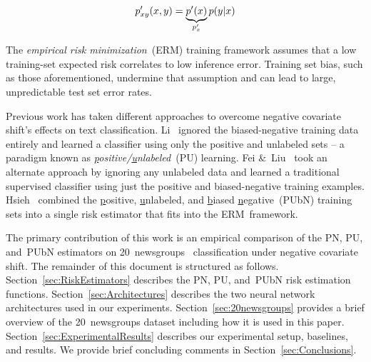 \documentclass[]{subfiles}
\begin{document}
\begin{equation}\label{eq:TestDist}
  p_{xy}'(x,y) = \underbrace{p'(x)}_{p_{x}'} p(y \vert x)
\end{equation}

The \textit{empirical risk minimization}~(ERM) training framework assumes that a low training-set expected risk correlates to low inference error. Training set bias, such as those aforementioned, undermine that assumption and can lead to large, unpredictable test set error rates.

Previous work has taken different approaches to overcome negative covariate shift's effects on text classification.  Li\etal~\cite{Li:2010} ignored the biased-negative training data entirely and learned a classifier using only the positive and unlabeled sets -- a paradigm known as \textit{\underline{p}ositive\-/\underline{u}nlabeled}~(PU) learning.  Fei \&~Liu~\cite{Fei:2015} took an alternate approach by ignoring any unlabeled data and learned a traditional supervised classifier using just the positive and biased-negative training examples.  Hsieh\etal~\cite{Hsieh:2018} combined the \underline{p}ositive, \underline{u}nlabeled, and \underline{b}iased \underline{n}egative~(PUbN) training sets into a single risk estimator that fits into the ERM~framework.

The primary contribution of this work is an empirical comparison of the PN, PU, and~PUbN estimators on 20~newsgroups~\cite{20newsgroups} classification under negative covariate shift.  The remainder of this document is structured as follows.  Section~\ref{sec:RiskEstimators} describes the PN, PU, and~PUbN risk estimation functions. Section~\ref{sec:Architectures} describes the two neural network architectures used in our experiments. Section~\ref{sec:20newsgroups} provides a brief overview of the 20~newsgroups dataset including how it is used in this paper. Section~\ref{sec:ExperimentalResults} describes our experimental setup, baselines, and results.  We provide brief concluding comments in Section~\ref{sec:Conclusions}.
\end{document}
